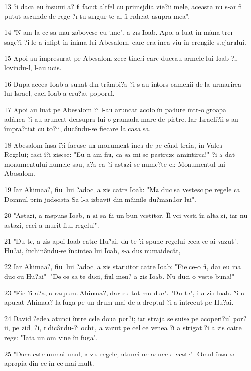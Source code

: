 \par 13 ?i daca eu însumi a? fi facut altfel cu primejdia vie?ii mele, aceasta nu s-ar fi putut ascunde de rege ?i tu singur te-ai fi ridicat asupra mea".
\par 14 "N-am la ce sa mai zabovesc cu tine", a zis Ioab. Apoi a luat în mâna trei sage?i ?i le-a înfipt în inima lui Abesalom, care era înca viu în crengile stejarului.
\par 15 Apoi au împresurat pe Abesalom zece tineri care duceau armele lui Ioab ?i, lovindu-l, l-au ucis.
\par 16 Dupa aceea Ioab a sunat din trâmbi?a ?i s-au întors oamenii de la urmarirea lui Israel, caci Ioab a cru?at poporul.
\par 17 Apoi au luat pe Abesalom ?i l-au aruncat acolo în padure într-o groapa adânca ?i au aruncat deasupra lui o gramada mare de pietre. Iar Israeli?ii s-au împra?tiat cu to?ii, ducându-se fiecare la casa sa.
\par 18 Abesalom însa î?i facuse un monument înca de pe când traia, în Valea Regelui; caci î?i zisese: "Eu n-am fiu, ca sa mi se pastreze amintirea!" ?i a dat monumentului numele sau, a?a ca ?i astazi se nume?te el: Monumentul lui Abesalom.
\par 19 Iar Ahimaa?, fiul lui ?adoc, a zis catre Ioab: "Ma duc sa vestesc pe regele ca Domnul prin judecata Sa l-a izbavit din mâinile du?manilor lui".
\par 20 "Astazi, a raspuns Ioab, n-ai sa fii un bun vestitor. Îl vei vesti în alta zi, iar nu astazi, caci a murit fiul regelui".
\par 21 "Du-te, a zis apoi Ioab catre Hu?ai, du-te ?i spune regelui ceea ce ai vazut". Hu?ai, închinându-se înaintea lui Ioab, s-a dus numaidecât,
\par 22 Iar Ahimaa?, fiul lui ?adoc, a zis staruitor catre Ioab: "Fie ce-o fi, dar eu ma duc cu Hu?ai". "De ce sa te duci, fiul meu? a zis Ioab. Nu duci o veste buna!"
\par 23 "Fie ?i a?a, a raspuns Ahimaa?, dar eu tot ma duc". "Du-te", i-a zis Ioab. ?i a apucat Ahimaa? la fuga pe un drum mai de-a dreptul ?i a întrecut pe Hu?ai.
\par 24 David ?edea atunci între cele doua por?i; iar straja se suise pe acoperi?ul por?ii, pe zid, ?i, ridicându-?i ochii, a vazut pe cel ce venea ?i a strigat ?i a zis catre rege: "Iata un om vine în fuga".
\par 25 "Daca este numai unul, a zis regele, atunci ne aduce o veste". Omul însa se apropia din ce în ce mai mult.
